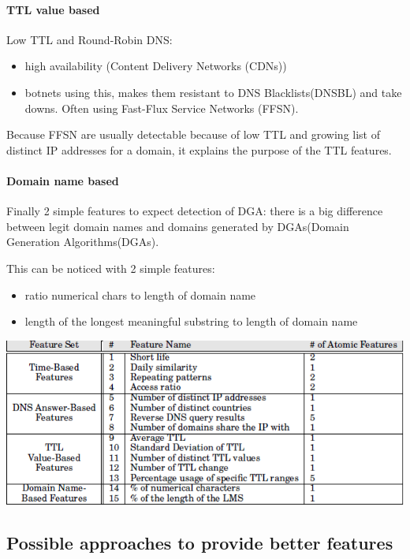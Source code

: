 \paragraph{TTL value based}
Low TTL and Round-Robin DNS: \\
\begin{itemize}[noitemsep]
\item high availability (Content Delivery Networks (CDNs))
\item botnets using this, makes them resistant to DNS Blacklists(DNSBL) and take downs. Often using Fast-Flux Service Networks (FFSN).
\end{itemize}
Because FFSN are usually detectable because of low TTL and growing list of distinct IP addresses for a domain, it explains the purpose of the TTL features.
\paragraph{Domain name based}
Finally 2 simple features to expect detection of DGA: there is a big difference between legit domain names and domains generated by DGAs(Domain Generation Algorithms(DGAs).

This can be noticed with 2 simple features:\\
\begin{itemize}[noitemsep]
\item ratio numerical chars to length of domain name
\item length of the longest meaningful substring to length of domain name
\end{itemize}
\includegraphics[scale=.3]{img/exposure_features.png}

\subsection{Possible approaches to provide better features}
